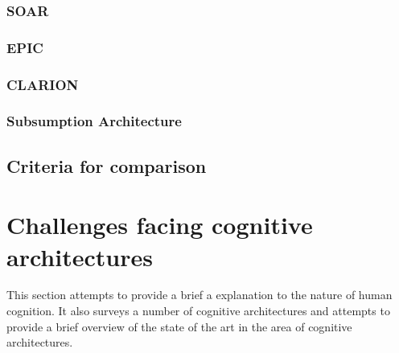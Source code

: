 
\subsubsection{SOAR}
\subsubsection{EPIC}
\subsubsection{CLARION}
\subsubsection{Subsumption Architecture}

\subsection{Criteria for comparison}






\section{Challenges facing cognitive architectures}

This section attempts to provide a brief a explanation to the nature
of human cognition. It also surveys a number of cognitive
architectures and attempts to provide a brief overview of the state of
the art in the area of cognitive architectures. 


